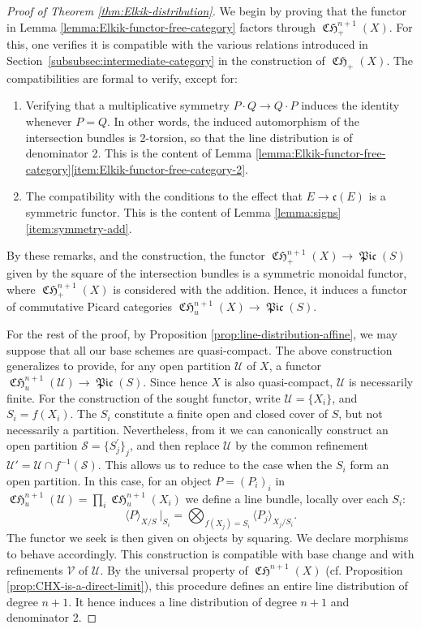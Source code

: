 \documentclass[11pt]{article}
\newcommand{\cf}{cf.\xspace}
\theoremstyle{plain}
\theoremstyle{definition}
\newcommand{\Scal}{\mathcal S}
\newcommand{\Ucal}{\mathcal U}
\newcommand{\Vcal}{\mathcal V}
\newcommand{\cfrak}{\mathfrak c}
\DeclareMathOperator{\CHfrak}{\mathfrak{CH}}
\DeclareMathOperator{\Picfr}{\mathfrak{Pic}}
\begin{document}
\begin{proof}[Proof of Theorem \ref{thm:Elkik-distribution}]
We begin by proving that the functor in Lemma \ref{lemma:Elkik-functor-free-category} factors through $\CHfrak_{+}^{n+1}(X)$. For this, one verifies it is compatible with the various relations introduced in Section~\ref{subsubsec:intermediate-category} in the construction of $\CHfrak_{+}(X)$. The compatibilities are formal to verify, except for:
\begin{enumerate}
\item Verifying that a multiplicative symmetry $P\cdot Q\to Q\cdot P$ induces the identity whenever $P = Q$. In other words, the induced automorphism of the intersection bundles is 2-torsion, so that the line distribution is of denominator 2. This is the content of Lemma \ref{lemma:Elkik-functor-free-category}\eqref{item:Elkik-functor-free-category-2}.
\item The compatibility with the conditions to the effect that $E\to\cfrak(E)$ is a symmetric functor. This is the content of Lemma \ref{lemma:signs}\eqref{item:symmetry-add}.
\end{enumerate}
By these remarks, and the construction, the functor $\CHfrak_{+}^{n+1}(X)\to\Picfr(S)$ given by the square of the intersection bundles is a symmetric monoidal functor, where $\CHfrak_{+}^{n+1}(X)$ is considered with the addition. Hence, it induces a functor of commutative Picard categories $\CHfrak_{u}^{n+1}(X)\to\Picfr(S)$.

For the rest of the proof, by Proposition \ref{prop:line-distribution-affine}, we may suppose that all our base schemes are quasi-compact. The above construction generalizes to provide, for any open partition $\Ucal$ of $X$, a functor $\CHfrak_{u}^{n+1}(\Ucal)\to\Picfr(S)$. Since hence $X$ is also quasi-compact, $\Ucal$ is necessarily finite. For the construction of the sought functor, write $\Ucal=\lbrace X_{i}\rbrace$, and $S_{i}=f(X_{i})$. The $S_{i}$ constitute a finite open and closed cover of $S$, but not necessarily a partition. Nevertheless, from it we can canonically construct an open partition $\Scal = \lbrace S_{j}^{\prime}\rbrace_{j}$, and then replace $\Ucal$ by the common refinement $\Ucal'=\Ucal \cap f^{-1}(\Scal)$. This allows us to reduce to the case when the $S_{i}$ form an open partition. In this case, for an object $P=(P_{i})_i$ in $\CHfrak_{u}^{n+1}(\Ucal)=\prod_{i}\CHfrak_{u}^{n+1}(X_{i})$ we define a line bundle, locally over each $S_{i}$:
\begin{displaymath}
\langle P \rangle_{X/S}\ |_{S_{i}} = \bigotimes_{f(X_{j}) = S_{i} } \langle P_{j}\rangle_{X_{j}/S_{i}}.
\end{displaymath}
The functor we seek is then given on objects by squaring. We declare morphisms to behave accordingly. This construction is compatible with base change and with refinements $\Vcal$ of $\Ucal$. By the universal property of $\CHfrak^{n+1}(X)$ (\cf Proposition \ref{prop:CHX-is-a-direct-limit}), this procedure defines an entire line distribution of degree $n+1$. It hence induces a line distribution of degree $n+1$ and denominator 2.
\end{proof}
\end{document}
